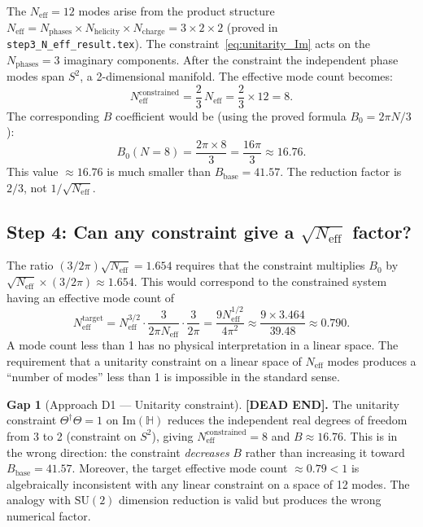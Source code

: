 \documentclass[11pt,a4paper]{article}
\theoremstyle{definition}
\newtheorem{gap}{Gap}
\theoremstyle{remark}
\begin{document}
The $N_{\mathrm{eff}} = 12$ modes arise from the product structure
$N_{\mathrm{eff}} = N_{\mathrm{phases}} \times N_{\mathrm{helicity}} \times N_{\mathrm{charge}} = 3 \times 2 \times 2$
(proved in \texttt{step3\_N\_eff\_result.tex}).
The constraint~\eqref{eq:unitarity_Im} acts on the $N_{\mathrm{phases}} = 3$
imaginary components.
After the constraint the independent phase modes span $S^2$, a 2-dimensional manifold.
The effective mode count becomes:
\begin{equation}
  N_{\mathrm{eff}}^{\mathrm{constrained}}
    = \frac{2}{3}\,N_{\mathrm{eff}}
    = \frac{2}{3} \times 12
    = 8.
  \label{eq:N_constrained}
\end{equation}
The corresponding $B$ coefficient would be (using the proved formula $B_0 = 2\pi N/3$):
\begin{equation}
  B_0(N=8) = \frac{2\pi \times 8}{3} = \frac{16\pi}{3} \approx 16.76.
  \label{eq:B_constrained}
\end{equation}
This value $\approx 16.76$ is much smaller than $B_{\mathrm{base}} = 41.57$.
The reduction factor is $2/3$, not $1/\sqrt{N_{\mathrm{eff}}}$.

\subsection{Step 4: Can any constraint give a $\sqrt{N_{\mathrm{eff}}}$ factor?}

The ratio $(3/2\pi)\sqrt{N_{\mathrm{eff}}} = 1.654$ requires that the constraint
multiplies $B_0$ by $\sqrt{N_{\mathrm{eff}}} \times (3/2\pi) \approx 1.654$.
This would correspond to the constrained system having an effective mode count of
\begin{equation}
  N_{\mathrm{eff}}^{\mathrm{target}} = N_{\mathrm{eff}}^{3/2} \cdot \frac{3}{2\pi N_{\mathrm{eff}}} \cdot \frac{3}{2\pi}
  = \frac{9 N_{\mathrm{eff}}^{1/2}}{4\pi^2}
  \approx \frac{9 \times 3.464}{39.48} \approx 0.790.
  \label{eq:N_target}
\end{equation}
A mode count less than 1 has no physical interpretation in a linear space.
The requirement that a unitarity constraint on a linear space of $N_{\mathrm{eff}}$
modes produces a ``number of modes'' less than 1 is impossible in the standard sense.

\begin{gap}[Approach D1 — Unitarity constraint]
\label{gap:D1}
  \textbf{[DEAD END].}
  The unitarity constraint $\Theta^\dagger\Theta = 1$ on $\mathrm{Im}(\mathbb{H})$
  reduces the independent real degrees of freedom from 3 to 2 (constraint on $S^2$),
  giving $N_{\mathrm{eff}}^{\mathrm{constrained}} = 8$ and $B \approx 16.76$.
  This is in the wrong direction: the constraint \emph{decreases} $B$ rather
  than increasing it toward $B_{\mathrm{base}} = 41.57$.
  Moreover, the target effective mode count $\approx 0.79 < 1$ is algebraically
  inconsistent with any linear constraint on a space of 12 modes.
  The analogy with $\mathrm{SU}(2)$ dimension reduction is valid but produces the
  wrong numerical factor.
\end{gap}
\end{document}
